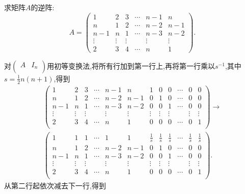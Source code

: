 \documentclass[../../main.tex]{subfiles}%
\begin{document}
\begin{example}
求矩阵\(A\)的逆阵:
\[
A = 
\begin{pmatrix}
1 & 2 & 3 & \cdots & n - 1 & n \\
n & 1 & 2 & \cdots & n - 2 & n - 1 \\
n - 1 & n & 1 & \cdots & n - 3 & n - 2 \\
\vdots & \vdots & \vdots & & \vdots & \vdots \\
2 & 3 & 4 & \cdots & n & 1
\end{pmatrix}.
\]
\end{example}
\begin{solution}
对\(\left( \begin{matrix}
A&		I_n\\
\end{matrix} \right) \)用初等变换法,将所有行加到第一行上,再将第一行乘以\(s^{-1}\),其中\(s = \frac{1}{2}n(n + 1)\),得到
\setcounter{MaxMatrixCols}{20} %
\begin{gather*}
\left( \begin{matrix}
1&		2&		3&		\cdots&		n-1&		n&		1&		0&		0&		\cdots&		0&		0\\
n&		1&		2&		\cdots&		n-2&		n-1&		0&		1&		0&		\cdots&		0&		0\\
n-1&		n&		1&		\cdots&		n-3&		n-2&		0&		0&		1&		\cdots&		0&		0\\
\vdots&		\vdots&		\vdots&		&		\vdots&		\vdots&		\vdots&		\vdots&		\vdots&		&		\vdots&		\vdots\\
2&		3&		4&		\cdots&		n&		1&		0&		0&		0&		\cdots&		0&		1\\
\end{matrix} \right) \rightarrow
\\
\left( \begin{matrix}
1&		1&		1&		\cdots&		1&		1&		\frac{1}{s}&		\frac{1}{s}&		\frac{1}{s}&		\cdots&		\frac{1}{s}&		\frac{1}{s}\\
n&		1&		2&		\cdots&		n-2&		n-1&		0&		1&		0&		\cdots&		0&		0\\
n-1&		n&		1&		\cdots&		n-3&		n-2&		0&		0&		1&		\cdots&		0&		0\\
\vdots&		\vdots&		\vdots&		&		\vdots&		\vdots&		\vdots&		\vdots&		\vdots&		&		\vdots&		\vdots\\
2&		3&		4&		\cdots&		n&		1&		0&		0&		0&		\cdots&		0&		1\\
\end{matrix} \right) .
\end{gather*}
从第二行起依次减去下一行,得到
\begin{gather*}

\end{gather*}
\end{solution}
\end{document}
